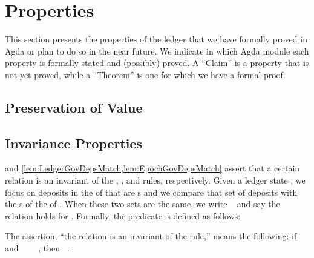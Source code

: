 \documentclass[11pt,a4paper,dvipsnames]{article}
\begin{document}
\tableofcontents



\section{Properties}
This section presents the properties of the ledger that we have formally proved in
Agda or plan to do so in the near future.  We indicate in which Agda module each
property is formally stated and (possibly) proved. A ``Claim'' is a property that is
not yet proved, while a ``Theorem'' is one for which we have a formal proof.

\subsection{Preservation of Value}

\subsection{Invariance Properties}
 and \cref{lem:LedgerGovDepsMatch,lem:EpochGovDepsMatch} assert that
a certain relation is an invariant of the \CHAIN{}, \LEDGER{}, and \EPOCH{} rules, respectively.
Given a ledger state , we focus on deposits in the
\UTxOState{} of  that are \GovActionDeposit{}s and we compare that set of
deposits with the \GovActionDeposit{}s of the \GovState{} of .
When these two sets are the same, we write ~ and say
the  relation holds for .
Formally, the  predicate is defined as follows:

The assertion, 
``the  relation is an invariant of the \LEDGER{} rule,''
means the following:  if \govDepsMatch{}~ and
~~~~, then
\govDepsMatch{}~.
\end{document}

